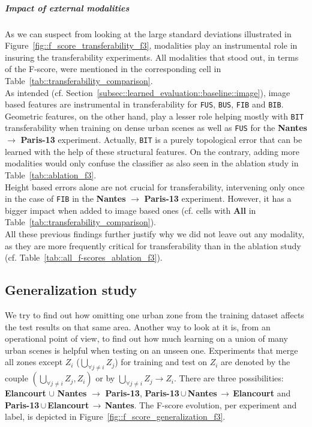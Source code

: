         \subparagraph{Impact of external modalities}
            As we can suspect from looking at the large standard deviations illustrated in Figure~\ref{fig::f_score_transferability_f3}, modalities play an instrumental role in insuring the transferability experiments.
            All modalities that stood out, in terms of the F-score, were mentioned in the corresponding cell in Table~\ref{tab::transferability_comparison}.\\
            As intended (cf. Section~\ref{subsec::learned_evaluation::baseline::image}), image based features are instrumental in transferability for \texttt{FUS}, \texttt{BUS}, \texttt{FIB} and \texttt{BIB}.\\
            Geometric features, on the other hand, play a lesser role helping mostly with \texttt{BIT} transferability when training on dense urban scenes as well as \texttt{FUS} for the \textbf{Nantes} \(\rightarrow\) \textbf{Paris-13} experiment.
            Actually, \texttt{BIT} is a purely topological error that can be learned with the help of these structural features.
            On the contrary, adding more modalities would only confuse the classifier as also seen in the ablation study in Table~\ref{tab::ablation_f3}.\\
            Height based errors alone are not crucial for transferability, intervening only once in the case of \texttt{FIB} in the \textbf{Nantes} \(\rightarrow\) \textbf{Paris-13} experiment.
            However, it has a bigger impact when added to image based ones (cf. cells with \textbf{All} in Table~\ref{tab::transferability_comparison}).\\
            All these previous findings further justify why we did not leave out any modality, as they are more frequently critical for transferability than in the ablation study (cf. Table~\ref{tab::all_f-scores_ablation_f3}).

    \subsection{Generalization study}
        \label{subsec::experiments::scalability::generalization}
        We try to find out how omitting one urban zone from the training dataset affects the test results on that same area.
        Another way to look at it is, from an operational point of view, to find out how much learning on a union of many urban scenes is helpful when testing on an unseen one.
        Experiments that merge all zones except $Z_i$ ($\underset{\forall j \neq i}{\bigcup} Z_j$) for training and test on $Z_i$ are denoted by the couple $(\underset{\forall j \neq i}{\bigcup} Z_j, Z_i)$ or by $ \underset{\forall j \neq i}{\bigcup} Z_j \rightarrow Z_i$.
        There are three possibilities: \textbf{Elancourt} $\cup$ \textbf{Nantes} \(\rightarrow\) \textbf{Paris-13}, \mbox{\textbf{Paris-13}}\,$\cup$\,\textbf{Nantes}\,\(\rightarrow\)\,\textbf{Elancourt} and \mbox{\textbf{Paris-13}}\,$\cup$\,\textbf{Elancourt}\,\(\rightarrow\)\,\textbf{Nantes}.
        The F-score evolution, per experiment and label, is depicted in Figure~\ref{fig::f_score_generalization_f3}.\\
    
